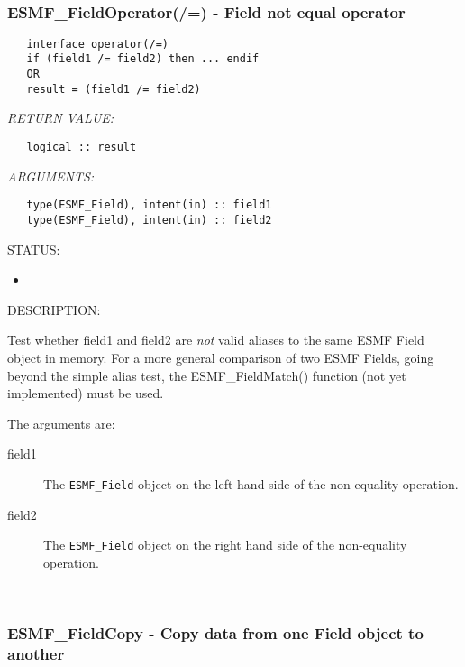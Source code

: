  
\mbox{}\hrulefill\ 
 
\subsubsection [ESMF\_FieldOperator(/=)] {ESMF\_FieldOperator(/=) - Field not equal operator}


  
\begin{verbatim}   interface operator(/=)
   if (field1 /= field2) then ... endif
   OR
   result = (field1 /= field2)\end{verbatim}{\em RETURN VALUE:}
\begin{verbatim}   logical :: result\end{verbatim}{\em ARGUMENTS:}
\begin{verbatim}   type(ESMF_Field), intent(in) :: field1
   type(ESMF_Field), intent(in) :: field2\end{verbatim}
{\sf STATUS:}
   \begin{itemize}
   \item{}
   \end{itemize}
  
{\sf DESCRIPTION:\\ }


   Test whether field1 and field2 are {\it not} valid aliases to the
   same ESMF Field object in memory. For a more general comparison of two ESMF
   Fields, going beyond the simple alias test, the ESMF\_FieldMatch() function
   (not yet implemented) must be used.
  
   The arguments are:
   \begin{description}
   \item[field1]
   The {\tt ESMF\_Field} object on the left hand side of the non-equality
   operation.
   \item[field2]
   The {\tt ESMF\_Field} object on the right hand side of the non-equality
   operation.
   \end{description}
   
 
\mbox{}\hrulefill\ 
 
\subsubsection [ESMF\_FieldCopy] {ESMF\_FieldCopy - Copy data from one Field object to another}


